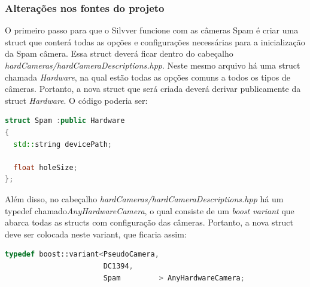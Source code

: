 \documentclass[a4paper,10pt]{article}
\begin{document}
\subsubsection{Alterações nos fontes do projeto}
O primeiro passo para que o Silvver funcione com as câmeras Spam é criar uma
struct que conterá todas as opções e configurações necessárias para a
inicialização da Spam câmera. Essa struct deverá ficar dentro do cabeçalho
\emph{hardCameras/hardCameraDescriptions.hpp}. Neste mesmo arquivo há uma
struct chamada \emph{Hardware}, na qual estão todas as opções comuns a todos
os tipos de câmeras. Portanto, a nova struct que será criada deverá derivar
publicamente da struct \emph{Hardware}. O código poderia ser:
\begin{lstlisting}[frame=lines,language=c++]
struct Spam :public Hardware
{
  std::string devicePath;

  float holeSize;
};
\end{lstlisting}
Além disso, no cabeçalho \emph{hardCameras/hardCameraDescriptions.hpp} há um
typedef chamado\emph{AnyHardwareCamera}, o qual consiste de um \emph{boost
  variant} que abarca todas as structs com configuração das câmeras. Portanto,
a nova struct deve ser colocada neste variant, que ficaria assim:
\begin{lstlisting}[frame=lines,language=c++]
typedef boost::variant<PseudoCamera,
                       DC1394,
                       Spam         > AnyHardwareCamera;
\end{lstlisting}
\end{document}
